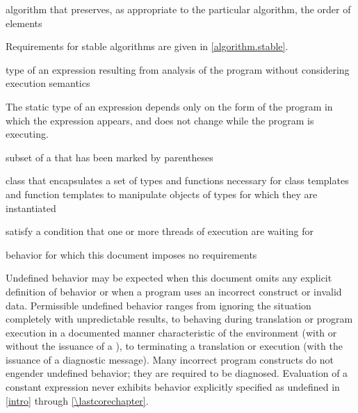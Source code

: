 %
%
algorithm that preserves, as appropriate to the particular algorithm, the order
of elements

\begin{defnote}
Requirements for stable algorithms are given in \ref{algorithm.stable}.
\end{defnote}

%
type of an expression resulting from
analysis of the program without considering execution semantics

\begin{defnote}
The static type of an expression depends only on the form of the program in
which the expression appears, and does not change while the program is
executing.
\end{defnote}

%
subset of a  that has
been marked by parentheses

%
class that encapsulates a set of types and functions necessary for class templates and
function templates to manipulate objects of types for which they are instantiated

%
satisfy a condition that one or more  threads of execution are waiting for

%
behavior for which this document
imposes no requirements

\begin{defnote}
Undefined behavior may be expected when
this document omits any explicit
definition of behavior or when a program uses an incorrect construct or invalid data.
Permissible undefined behavior ranges
from ignoring the situation completely with unpredictable results, to
behaving during translation or program execution in a documented manner
characteristic of the environment (with or without the issuance of a
), to terminating a translation or execution (with the
issuance of a diagnostic message). Many incorrect program constructs do
not engender undefined behavior; they are required to be diagnosed.
Evaluation of a constant expression never exhibits behavior explicitly
specified as undefined in \ref{intro} through \ref{\lastcorechapter}.
\end{defnote}

